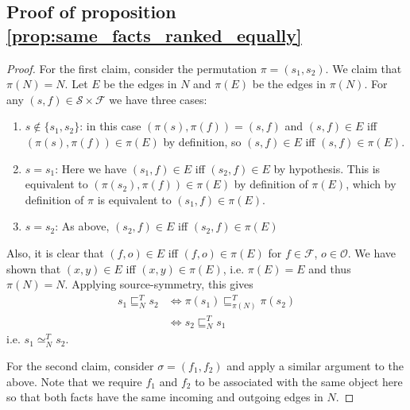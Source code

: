 \documentclass{article}
\theoremstyle{definition} \newtheorem{definition}{Definition}
\theoremstyle{definition} \newtheorem{example}{Example}
\theoremstyle{plain} \newtheorem{axiom}{Axiom}
\theoremstyle{plain} \newtheorem*{remark}{Remark}
\theoremstyle{remark} \newtheorem*{notation}{Notation}
\theoremstyle{plain} \newtheorem{lemma}{Lemma}
\theoremstyle{plain} \newtheorem{theorem}{Theorem}
\theoremstyle{plain} \newtheorem{proposition}{Proposition}
\renewcommand{\S}{\mathcal{S}}  %
\renewcommand{\O}{\mathcal{O}}  %
\newcommand{\F}{\mathcal{F}}
\newcommand{\sle}{\sqsubseteq}
\newcommand{\seq}{\simeq}
\begin{document}
\subsection{Proof of proposition \ref{prop:same_facts_ranked_equally}}
\begin{proof}

For the first claim, consider the permutation $\pi = (s_1, s_2)$. We claim that
$\pi(N) = N$. Let $E$ be the edges in $N$ and $\pi(E)$ be the edges in
$\pi(N)$. For any $(s, f) \in \S \times \F$ we have three cases:
\begin{enumerate}
\item $s \notin \{s_1, s_2\}$: in this case $(\pi(s), \pi(f)) = (s, f)$ and
$(s, f) \in E$ iff $(\pi(s), \pi(f)) \in \pi(E)$ by definition, so
$(s, f) \in E$ iff $(s, f) \in \pi(E)$.

\item $s=s_1$: Here we have $(s_1, f) \in E$ iff $(s_2, f) \in E$ by
hypothesis. This is equivalent to $(\pi(s_2), \pi(f)) \in \pi(E)$ by definition
of $\pi(E)$, which by definition of $\pi$ is equivalent to $(s_1, f) \in
\pi(E)$.

\item $s=s_2$: As above, $(s_2, f) \in E$ iff $(s_2, f) \in \pi(E)$
\end{enumerate}
Also, it is clear that $(f, o) \in E$ iff $(f, o) \in \pi(E)$ for $f \in \F$,
$o \in \O$. We have shown that $(x, y) \in E$ iff $(x, y) \in \pi(E)$, i.e.
$\pi(E) = E$ and thus $\pi(N) = N$. Applying source-symmetry, this gives
\begin{align*}
    s_1 \sle_N^T s_2 & \iff \pi(s_1) \sle_{\pi(N)}^T \pi(s_2) \\
                     & \iff s_2 \sle_N^T s_1
\end{align*}
i.e. $s_1 \seq_N^T s_2$.

For the second claim, consider $\sigma = (f_1, f_2)$ and apply a similar
argument to the above. Note that we require $f_1$ and $f_2$ to be associated
with the same object here so that both facts have the same incoming and
outgoing edges in $N$.

\end{proof}
\end{document}
